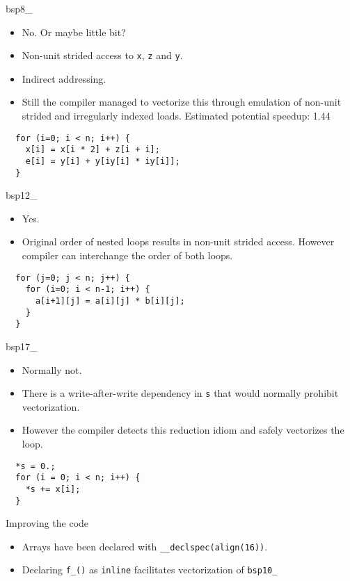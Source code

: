 \begin{frame}[fragile]{bsp8\_}
\begin{itemize}
\item No. Or maybe little bit?
\item Non-unit strided access to \texttt{x}, \texttt{z} and \texttt{y}.
\item Indirect addressing.
\item Still the compiler managed to vectorize this through emulation of non-unit strided and irregularly indexed loads. Estimated potential speedup: 1.44
\end{itemize}
\begin{verbatim}
  for (i=0; i < n; i++) {
    x[i] = x[i * 2] + z[i + i];
    e[i] = y[i] + y[iy[i] * iy[i]];
  }
\end{verbatim}
\end{frame}

\begin{frame}[fragile]{bsp12\_}
\begin{itemize}
\item Yes.
\item Original order of nested loops results in non-unit strided access. However compiler can interchange the order of both loops.
\end{itemize}
\begin{verbatim}
  for (j=0; j < n; j++) {
    for (i=0; i < n-1; i++) {
      a[i+1][j] = a[i][j] * b[i][j];
    }
  }
\end{verbatim}
\end{frame}

\begin{frame}[fragile]{bsp17\_}
\begin{itemize}
\item Normally not.
\item There is a write-after-write dependency in \texttt{s} that would normally prohibit vectorization.
\item However the compiler detects this reduction idiom and safely vectorizes the loop.
\end{itemize}
\begin{verbatim}
  *s = 0.;
  for (i = 0; i < n; i++) {
    *s += x[i];
  }
\end{verbatim}
\end{frame}

\begin{frame}{Improving the code}
\begin{itemize}
\item Arrays have been declared with \texttt{\_\_declspec(align(16))}.
\item Declaring \texttt{f\_()} as \texttt{inline} facilitates vectorization of \texttt{bsp10\_}
\end{itemize}
\end{frame}
